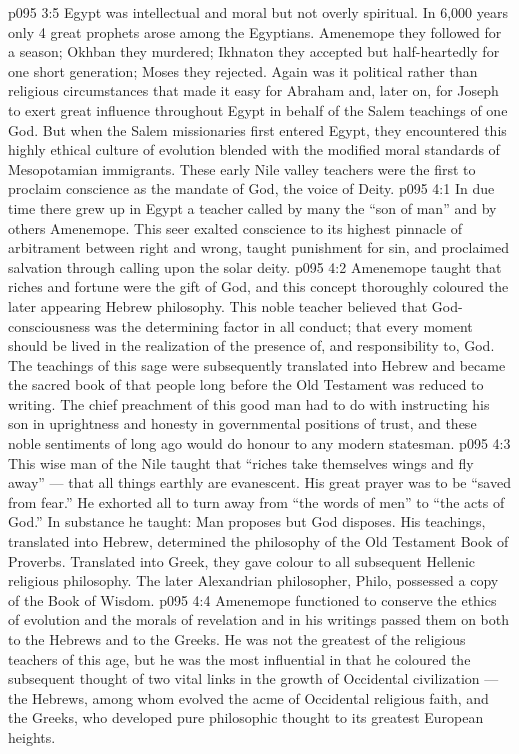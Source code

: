 \vs p095 3:5 \pc Egypt was intellectual and moral but not overly spiritual. In 6,000 years only 4 great prophets arose among the Egyptians. Amenemope they followed for a season; Okhban they murdered; Ikhnaton they accepted but half\hyp{}heartedly for one short generation; Moses they rejected. Again was it political rather than religious circumstances that made it easy for Abraham and, later on, for Joseph to exert great influence throughout Egypt in behalf of the Salem teachings of one God. But when the Salem missionaries first entered Egypt, they encountered this highly ethical culture of evolution blended with the modified moral standards of Mesopotamian immigrants. These early Nile valley teachers were the first to proclaim conscience as the mandate of God, the voice of Deity.
\vs p095 4:1 In due time there grew up in Egypt a teacher called by many the “son of man” and by others Amenemope. This seer exalted conscience to its highest pinnacle of arbitrament between right and wrong, taught punishment for sin, and proclaimed salvation through calling upon the solar deity.
\vs p095 4:2 Amenemope taught that riches and fortune were the gift of God, and this concept thoroughly coloured the later appearing Hebrew philosophy. This noble teacher believed that God\hyp{}consciousness was the determining factor in all conduct; that every moment should be lived in the realization of the presence of, and responsibility to, God. The teachings of this sage were subsequently translated into Hebrew and became the sacred book of that people long before the Old Testament was reduced to writing. The chief preachment of this good man had to do with instructing his son in uprightness and honesty in governmental positions of trust, and these noble sentiments of long ago would do honour to any modern statesman.
\vs p095 4:3 This wise man of the Nile taught that “riches take themselves wings and fly away” --- that all things earthly are evanescent. His great prayer was to be “saved from fear.” He exhorted all to turn away from “the words of men” to “the acts of God.” In substance he taught: Man proposes but God disposes. His teachings, translated into Hebrew, determined the philosophy of the Old Testament Book of Proverbs. Translated into Greek, they gave colour to all subsequent Hellenic religious philosophy. The later Alexandrian philosopher, Philo, possessed a copy of the Book of Wisdom.
\vs p095 4:4 Amenemope functioned to conserve the ethics of evolution and the morals of revelation and in his writings passed them on both to the Hebrews and to the Greeks. He was not the greatest of the religious teachers of this age, but he was the most influential in that he coloured the subsequent thought of two vital links in the growth of Occidental civilization --- the Hebrews, among whom evolved the acme of Occidental religious faith, and the Greeks, who developed pure philosophic thought to its greatest European heights.
